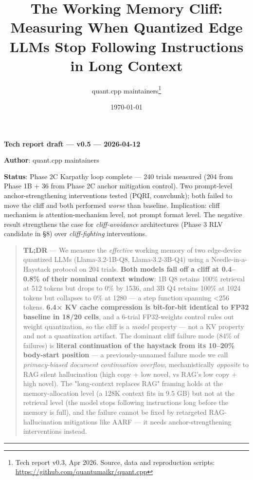 \documentclass[11pt]{article}
\title{The Working Memory Cliff: Measuring When Quantized Edge LLMs Stop Following Instructions in Long Context}
\author{quant.cpp maintainers\thanks{Tech report v0.3, Apr 2026. Source, data and reproduction scripts: \url{https://github.com/quantumaikr/quant.cpp}}}
\date{\today}
\begin{document}
\maketitle



\textbf{Tech report draft — v0.5 — 2026-04-12}

\textbf{Author}: quant.cpp maintainers

\textbf{Status}: Phase 2C Karpathy loop complete — 240 trials measured (204 from Phase 1B + 36 from Phase 2C anchor mitigation control). Two prompt-level anchor-strengthening interventions tested (PQRI, convchunk); both failed to move the cliff and both performed \textit{worse} than baseline. Implication: cliff mechanism is attention-mechanism level, not prompt format level. The negative result strengthens the case for \textit{cliff-avoidance} architectures (Phase 3 RLV candidate in §8) over \textit{cliff-fighting} interventions.


\begin{quote}
\textbf{TL;DR} — We measure the \textit{effective} working memory of two edge-device quantized LLMs (Llama-3.2-1B-Q8, Llama-3.2-3B-Q4) using a Needle-in-a-Haystack protocol on 204 trials. \textbf{Both models fall off a cliff at 0.4–0.8\% of their nominal context window}: 1B Q8 retains 100\% retrieval at 512 tokens but drops to 0\% by 1536, and 3B Q4 retains 100\% at 1024 tokens but collapses to 0\% at 1280 — a step function spanning <256 tokens. \textbf{6.4× KV cache compression is bit-for-bit identical to FP32 baseline in 18/20 cells}, and a 6-trial FP32-weights control rules out weight quantization, so the cliff is a \textit{model} property — not a KV property and not a quantization artifact. The dominant cliff failure mode (84\% of failures) is \textbf{literal continuation of the haystack from its 10–20\% body-start position} — a previously-unnamed failure mode we call \textit{primacy-biased document continuation overflow}, mechanistically \textit{opposite} to RAG silent hallucination (high copy + low novel, vs RAG's low copy + high novel). The "long-context replaces RAG" framing holds at the memory-allocation level (a 128K context fits in 9.5 GB) but not at the retrieval level (the model stops following instructions long before the memory is full), and the failure cannot be fixed by retargeted RAG-hallucination mitigations like AARF — it needs anchor-strengthening interventions instead.
\end{quote}


\medskip\hrule\medskip
\end{document}
